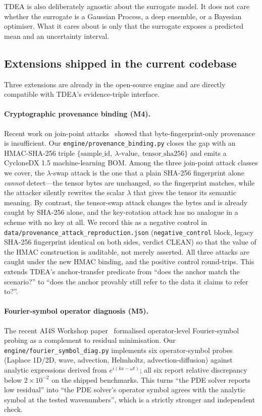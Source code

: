 \documentclass[review,3p]{elsarticle}
\begin{document}
TDEA is also deliberately agnostic about the surrogate model. It does not care whether the surrogate is a Gaussian Process, a deep ensemble, or a Bayesian optimiser. What it cares about is only that the surrogate exposes a predicted mean and an uncertainty interval.

\subsection{Extensions shipped in the current codebase}
\label{sec:disc-ext}

Three extensions are already in the open-source engine and are directly compatible with TDEA's evidence-triple interface.

\paragraph{Cryptographic provenance binding (M4).} Recent work on join-point attacks~\cite{provenance2026attack} showed that byte-fingerprint-only provenance is insufficient. Our \texttt{engine/provenance\_binding.py} closes the gap with an HMAC-SHA-256 triple $\{\text{sample\_id},\ \lambda\text{-value},\ \text{tensor\_sha256}\}$ and emits a CycloneDX 1.5 machine-learning BOM. Among the three join-point attack classes we cover, the $\lambda$-swap attack is the one that a plain SHA-256 fingerprint alone \emph{cannot} detect---the tensor bytes are unchanged, so the fingerprint matches, while the attacker silently rewrites the scalar $\lambda$ that gives the tensor its semantic meaning. By contrast, the tensor-swap attack changes the bytes and is already caught by SHA-256 alone, and the key-rotation attack has no analogue in a scheme with no key at all. We record this as a negative control in \texttt{data/provenance\_attack\_reproduction.json} (\texttt{negative\_control} block, legacy SHA-256 fingerprint identical on both sides, verdict CLEAN) so that the value of the HMAC construction is auditable, not merely asserted. All three attacks are caught under the new HMAC binding, and the positive control round-trips. This extends TDEA's anchor-transfer predicate from ``does the anchor match the scenario?'' to ``does the anchor provably still refer to the data it claims to refer to?''.

\paragraph{Fourier-symbol operator diagnosis (M5).} The recent AI4S Workshop paper~\cite{symbol2026diag} formalised operator-level Fourier-symbol probing as a complement to residual minimisation. Our \texttt{engine/fourier\_symbol\_diag.py} implements six operator-symbol probes (Laplace 1D/2D, wave, advection, Helmholtz, advection-diffusion) against analytic expressions derived from $e^{i(kx - \omega t)}$; all six report relative discrepancy below $2\times 10^{-2}$ on the shipped benchmarks. This turns ``the PDE solver reports low residual'' into ``the PDE solver's operator symbol agrees with the analytic symbol at the tested wavenumbers'', which is a strictly stronger and independent check.
\end{document}
